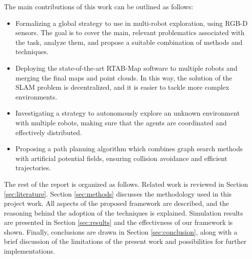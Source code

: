 The main contributions of this work can be outlined as follows:
\begin{itemize}
    \item Formalizing a global strategy to use in multi-robot exploration, using RGB-D sensors. The goal is to cover the main, relevant problematics associated with the task, analyze them, and propose a suitable combination of methods and techniques.
    \item Deploying the state-of-the-art RTAB-Map software to multiple robots and merging the final maps and point clouds. In this way, the solution of the SLAM problem is decentralized, and it is easier to tackle more complex environments.
    \item Investigating a strategy to autonomously explore an unknown environment with multiple robots, making sure that the agents are coordinated and effectively distributed.
    \item Proposing a path planning algorithm which combines graph search methods with artificial potential fields, ensuring collision avoidance and efficient trajectories.
\end{itemize}
The rest of the report is organized as follows. Related work is reviewed in Section \ref{sec:literature}. Section \ref{sec:methods} discusses the methodology used in this project work. All aspects of the proposed framework are described, and the reasoning behind the adoption of the techniques is explained. Simulation results are presented in Section \ref{sec:results} and the effectivness of our framework is shown. Finally, conclusions are drawn in Section \ref{sec:conclusion}, along with a brief discussion of the limitations of the present work and possibilities for further implementations.





